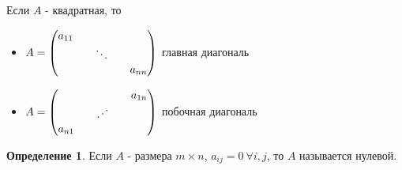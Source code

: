 \documentclass[a4paper, 12pt]{article}
\theoremstyle{definition}
\newtheorem*{definition}{Определение}
\begin{document}
    \newpage
    Если $A$ - квадратная, то
    \begin{itemize}
      \item $ A =\begin{pmatrix}
        a_{11} && \null && \null \\
        \null && \ddots && \null \\
        \null && \null && a_{nn} 
      \end{pmatrix} $ главная диагональ
      \item $ A =
      \begin{pmatrix}
        \null && \null && a_{1n} \\
        \null && \reflectbox{$\ddots$} && \null \\
        a_{n1}  && \null && \null
      \end{pmatrix} $ побочная диагональ
    \end{itemize}
    
    \begin{definition}
      Если $A$ - размера $m\times n$, $a_{ij} = 0\ \forall i,j$, то $A$ называется нулевой.
    \end{definition}
\end{document}

